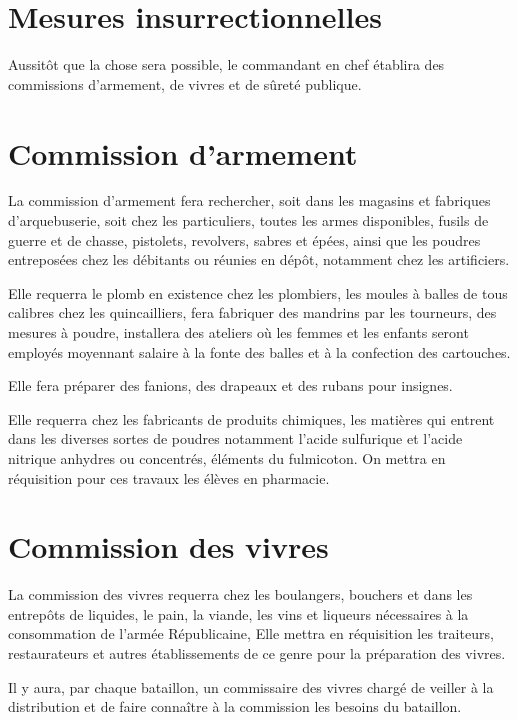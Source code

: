 \documentclass[french,twoside]{book} %
\begin{document}
\section[{Mesures insurrectionnelles}]{Mesures insurrectionnelles}\renewcommand{\leftmark}{Mesures insurrectionnelles}

\noindent Aussitôt que la chose sera possible, le commandant en chef établira des commissions d’armement, de vivres et de sûreté publique.
\section[{Commission d’armement}]{Commission d’armement}\renewcommand{\leftmark}{Commission d’armement}

\noindent La commission d’armement fera rechercher, soit dans les magasins et fabriques d’arquebuserie, soit chez les particuliers, toutes les armes disponibles, fusils de guerre et de chasse, pistolets, revolvers, sabres et épées, ainsi que les poudres entreposées chez les débitants ou réunies en dépôt, notamment chez les artificiers.\par
Elle requerra le plomb en existence chez les plombiers, les moules à balles de tous calibres chez les quincailliers, fera fabriquer des mandrins par les tourneurs, des mesures à poudre, installera des ateliers où les femmes et les enfants seront employés moyennant salaire à la fonte des balles et à la confection des cartouches.\par
Elle fera préparer des fanions, des drapeaux et des rubans pour insignes.\par
Elle requerra chez les fabricants de produits chimiques, les matières qui entrent dans les diverses sortes de poudres notamment l’acide sulfurique et l’acide nitrique anhydres ou concentrés, éléments du fulmicoton. On mettra en réquisition pour ces travaux les élèves en pharmacie.
\section[{Commission des vivres}]{Commission des vivres}\renewcommand{\leftmark}{Commission des vivres}

\noindent La commission des vivres requerra chez les boulangers, bouchers et dans les entrepôts de liquides, le pain, la viande, les vins et liqueurs nécessaires à la consommation de l’armée Républicaine, Elle mettra en réquisition les traiteurs, restaurateurs et autres établissements de ce genre pour la préparation des vivres.\par
Il y aura, par chaque bataillon, un commissaire des vivres chargé de veiller à la distribution et de faire connaître à la commission les besoins du bataillon.
\end{document}
